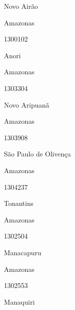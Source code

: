 \documentclass[
  letterpaper,
]{report}
\begin{document}
\n      

Novo Airão

\n    

\n    

\n      

Amazonas

\n      

1300102

\n      

Anori

\n    

\n    

\n      

Amazonas

\n      

1303304

\n      

Novo Aripuanã

\n    

\n    

\n      

Amazonas

\n      

1303908

\n      

São Paulo de Olivença

\n    

\n    

\n      

Amazonas

\n      

1304237

\n      

Tonantins

\n    

\n    

\n      

Amazonas

\n      

1302504

\n      

Manacapuru

\n    

\n    

\n      

Amazonas

\n      

1302553

\n      

Manaquiri

\n    

\n    

\n      
\end{document}
